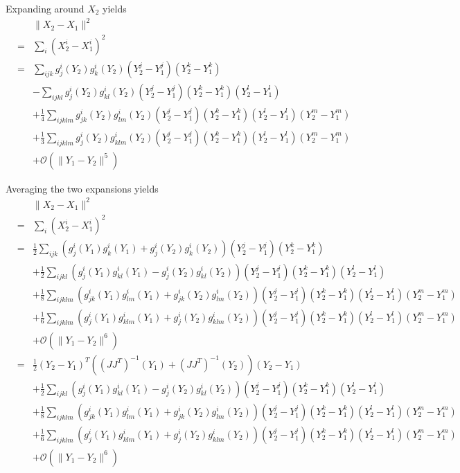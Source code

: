 \documentclass[12pt]{article}
\begin{document}
Expanding around $X_2$ yields
\begin{eqnarray}
&&\| X_2 - X_1 \|^2 \\
&=&  \sum_i (X_2^i - X_1^i)^2 \\
&=& \sum_{ijk} g_j^i (Y_2) g_k^i (Y_2) (Y^j_2 - Y^j_1 ) (Y^k_2 - Y^k_1 ) \\
&& - \sum_{ijkl} g_j^i (Y_2) g^i_{kl} (Y_2) (Y^j_2 - Y^j_1 )  (Y^k_2 - Y^k_1)(Y^l_2 - Y^l_1) \\
&& + \frac{1}{4} \sum_{ijklm}  g^i_{jk} (Y_2) g^i_{lm} (Y_2) (Y^j_2 - Y^j_1) (Y^k_2 - Y^k_1) (Y^l_2 - Y^l_1) (Y^m_2 - Y^m_1) \\
&& + \frac{1}{3} \sum_{ijklm}  g^i_{j} (Y_2) g^i_{klm} (Y_2) (Y^j_2 - Y^j_1) (Y^k_2 - Y^k_1) (Y^l_2 - Y^l_1) (Y^m_2 - Y^m_1) \\
&& + \mathcal{O} (\|Y_1 - Y_2 \|^5 )
\end{eqnarray}

Averaging the two expansions yields
\begin{eqnarray}
&&\| X_2 - X_1 \|^2 \\
&=&  \sum_i (X_2^i - X_1^i)^2 \\
&=& \frac{1}{2} \sum_{ijk} \left( g_j^i (Y_1) g_k^i (Y_1) + g_j^i (Y_2) g_k^i (Y_2) \right) (Y^j_2 - Y^j_1 ) (Y^k_2 - Y^k_1 ) \\
&& + \frac{1}{2} \sum_{ijkl} \left( g_j^i (Y_1) g^i_{kl} (Y_1) - g_j^i (Y_2) g^i_{kl} (Y_2) \right) (Y^j_2 - Y^j_1 )  (Y^k_2 - Y^k_1)(Y^l_2 - Y^l_1) \\
&& + \frac{1}{8} \sum_{ijklm}  \left( g^i_{jk} (Y_1) g^i_{lm} (Y_1) + g^i_{jk} (Y_2) g^i_{lm} (Y_2)  \right) (Y^j_2 - Y^j_1) (Y^k_2 - Y^k_1) (Y^l_2 - Y^l_1) (Y^m_2 - Y^m_1) \\
&& + \frac{1}{6} \sum_{ijklm}  \left( g^i_{j} (Y_1) g^i_{klm} (Y_1) + g^i_{j} (Y_2) g^i_{klm} (Y_2)  \right)(Y^j_2 - Y^j_1) (Y^k_2 - Y^k_1) (Y^l_2 - Y^l_1) (Y^m_2 - Y^m_1) \\
&& + \mathcal{O} (\|Y_1 - Y_2 \|^6 ) \\
&=& \frac{1}{2} (Y_2 - Y_1 )^T ((J J^T)^{-1} (Y_1) + (J J^T)^{-1}(Y_2)) (Y_2 - Y_1 ) \\
&& + \frac{1}{2} \sum_{ijkl} \left( g_j^i (Y_1) g^i_{kl} (Y_1) - g_j^i (Y_2) g^i_{kl} (Y_2) \right) (Y^j_2 - Y^j_1 )  (Y^k_2 - Y^k_1)(Y^l_2 - Y^l_1) \\
&& + \frac{1}{8} \sum_{ijklm}  \left( g^i_{jk} (Y_1) g^i_{lm} (Y_1) + g^i_{jk} (Y_2) g^i_{lm} (Y_2)  \right) (Y^j_2 - Y^j_1) (Y^k_2 - Y^k_1) (Y^l_2 - Y^l_1) (Y^m_2 - Y^m_1) \\
&& + \frac{1}{6} \sum_{ijklm}  \left( g^i_{j} (Y_1) g^i_{klm} (Y_1) + g^i_{j} (Y_2) g^i_{klm} (Y_2)  \right)(Y^j_2 - Y^j_1) (Y^k_2 - Y^k_1) (Y^l_2 - Y^l_1) (Y^m_2 - Y^m_1) \\
&& + \mathcal{O} (\|Y_1 - Y_2 \|^6 ) 
\end{eqnarray}
\end{document}
